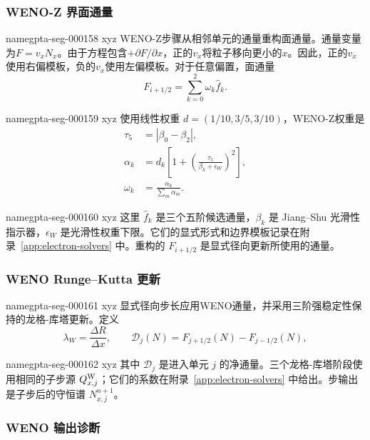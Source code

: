\documentclass[twocolumn]{aastex702}
\makeatletter
\providecommand{\gptareaderanchor}[1]{\pdfdest name{#1} xyz}%
\providecommand{\gptareaderanchor}[1]{\special{pdf:dest (#1) [ @thispage /XYZ @xpos @ypos null ]}}%
\makeatother
\begin{document}
\subsubsection{WENO-Z 界面通量}


\gptareaderanchor{gpta-seg-000158}%
WENO-Z步骤从相邻单元的通量重构面通量。通量变量为\(F=v_xN_x\)。由于方程包含\(+\partial F/\partial x\)，正的\(v_x\)将粒子移向更小的\(x\)。因此，正的\(v_x\)使用右偏模板，负的\(v_x\)使用左偏模板。对于任意偏置，面通量
\begin{equation}
F_{i+1/2}=\sum_{k=0}^{2}\omega_k\hat f_k .
\end{equation}

\gptareaderanchor{gpta-seg-000159}%
使用线性权重 \(d=(1/10,3/5,3/10)\)，WENO-Z权重是
\begin{equation}
\begin{aligned}
\tau_5&=|\beta_0-\beta_2|,\\
\alpha_k&=d_k\left[1+
\left(\frac{\tau_5}{\beta_k+\epsilon_W}\right)^2\right],
\\
\omega_k&=\frac{\alpha_k}{\sum_m\alpha_m}.
\end{aligned}
\end{equation}

\gptareaderanchor{gpta-seg-000160}%
这里 \(\hat f_k\) 是三个五阶候选通量，\(\beta_k\) 是 Jiang–Shu 光滑性指示器，\(\epsilon_W\) 是光滑性权重下限。它们的显式形式和边界模板记录在附录~\ref{app:electron-solvers} 中。重构的 \(F_{i+1/2}\) 是显式径向更新所使用的通量。

\subsubsection{WENO Runge--Kutta 更新}


\gptareaderanchor{gpta-seg-000161}%
显式径向步长应用WENO通量，并采用三阶强稳定性保持的龙格-库塔更新。定义
\begin{equation}
\lambda_W=\frac{\Delta R}{\Delta x},
\qquad
\mathcal{D}_j(N)=F_{j+1/2}(N)-F_{j-1/2}(N),
\end{equation}

\gptareaderanchor{gpta-seg-000162}%
其中 \(\mathcal{D}_j\) 是进入单元 \(j\) 的净通量。三个龙格-库塔阶段使用相同的子步源 \(Q_{x,j}^{\rm W}\)；它们的系数在附录~\ref{app:electron-solvers} 中给出。步输出是子步后的守恒谱 \(N_{x,j}^{n+1}\)。

\subsubsection{WENO 输出诊断}
\end{document}
